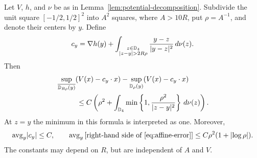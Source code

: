 \begin{lemma}
\label{lem:affine-profile}
Let \(V\), \(h\), and \(\nu\) be as in
Lemma~\ref{lem:potential-decomposition}.  Subdivide the unit square
\([-1/2,1/2]^2\) into \(A^2\) squares, where \(A>10R\), put
\(\rho=A^{-1}\), and denote their centers by \(y\).  Define
\[
 c_y=\nabla h(y)
   +\int_{\substack{z\in\mathbb D_4\\\lvert z-y\rvert>2R\rho}}
        \frac{y-z}{\lvert y-z\rvert^2}\,d\nu(z).
\]
Then
\begin{equation}
\begin{aligned}
 &\sup_{\overline{\mathbb D_{R\rho}(y)}}(V(x)-c_y\cdot x)
     -\sup_{\mathbb D_\rho(y)}(V(x)-c_y\cdot x)\\
 &\hspace{1cm}\le
 C\left(\rho^2+\int_{\mathbb D_4}
      \min\left\{1,\frac{\rho^2}{\lvert z-y\rvert^2}\right\}\,d\nu(z)
   \right).
\end{aligned}
\label{eq:affine-error}
\end{equation}
At \(z=y\) the minimum in this formula is interpreted as one.
Moreover,
\[
 \operatorname{avg}_y\lvert c_y\rvert\le C,
 \qquad
 \operatorname{avg}_y\left[\text{right-hand side of \eqref{eq:affine-error}}\right]
 \le C\rho^2(1+\lvert\log\rho\rvert).
\]
The constants may depend on \(R\), but are independent of \(A\) and
\(V\).
\end{lemma}

